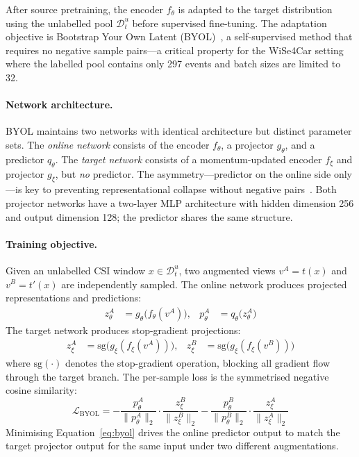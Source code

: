 \documentclass[english,bibtex]{kththesis}
\begin{document}
After source pretraining, the encoder $f_\theta$ is adapted to the target distribution using the unlabelled pool $\mathcal{D}_t^u$ before supervised fine-tuning. The adaptation objective is Bootstrap Your Own Latent (BYOL)~\cite{grill2020byol}, a self-supervised method that requires no negative sample pairs---a critical property for the WiSe4Car setting where the labelled pool contains only 297 events and batch sizes are limited to 32.

\paragraph{Network architecture.}
BYOL maintains two networks with identical architecture but distinct parameter sets. The \emph{online network} consists of the encoder $f_\theta$, a projector $g_\theta$, and a predictor $q_\theta$. The \emph{target network} consists of a momentum-updated encoder $f_\xi$ and projector $g_\xi$, but \emph{no} predictor. The asymmetry---predictor on the online side only---is key to preventing representational collapse without negative pairs~\cite{grill2020byol}. Both projector networks have a two-layer MLP architecture with hidden dimension 256 and output dimension 128; the predictor shares the same structure.

\paragraph{Training objective.}
Given an unlabelled CSI window $x \in \mathcal{D}_t^u$, two augmented views $v^A = t(x)$ and $v^B = t'(x)$ are independently sampled. The online network produces projected representations and predictions:
\begin{align}
  z_\theta^A &= g_\theta\!\bigl(f_\theta(v^A)\bigr), &
  p_\theta^A &= q_\theta\!\bigl(z_\theta^A\bigr)
\end{align}
The target network produces stop-gradient projections:
\begin{align}
  z_\xi^A &= \mathrm{sg}\!\bigl(g_\xi(f_\xi(v^A))\bigr), &
  z_\xi^B &= \mathrm{sg}\!\bigl(g_\xi(f_\xi(v^B))\bigr)
\end{align}
where $\mathrm{sg}(\cdot)$ denotes the stop-gradient operation, blocking all gradient flow through the target branch. The per-sample loss is the symmetrised negative cosine similarity:
\begin{equation}
  \mathcal{L}_\text{BYOL}
    = -\frac{p_\theta^A}{\|p_\theta^A\|_2} \cdot \frac{z_\xi^B}{\|z_\xi^B\|_2}
      -\frac{p_\theta^B}{\|p_\theta^B\|_2} \cdot \frac{z_\xi^A}{\|z_\xi^A\|_2}
\label{eq:byol}
\end{equation}
Minimising Equation~\eqref{eq:byol} drives the online predictor output to match the target projector output for the same input under two different augmentations.
\end{document}
